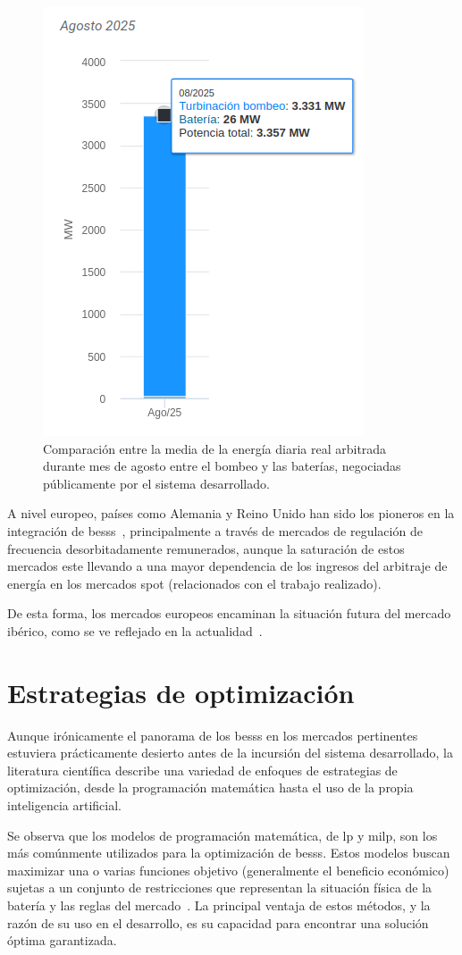 \begin{figure}
  \centering
  \includegraphics[width=0.4\linewidth]{figures/comparacion-energia-ciclada.png}
  \caption[Comparación de la energía diaria arbitrada.]{Comparación entre la media de la energía diaria real arbitrada durante mes de agosto entre el bombeo y las baterías, negociadas públicamente por el sistema desarrollado.}
  \label{fig:comparacion-energia-ciclada}
\end{figure}

A nivel europeo, países como Alemania y Reino Unido han sido los pioneros en la integración de \glspl{bess}~\cite{kivipelto2017grid, tejada2019review}, principalmente a través de mercados de regulación de frecuencia desorbitadamente remunerados, aunque la saturación de estos mercados este llevando a una mayor dependencia de los ingresos del arbitraje de energía en los mercados spot (relacionados con el trabajo realizado).

De esta forma, los mercados europeos encaminan la situación futura del mercado ibérico, como se ve reflejado en la actualidad~\cite{kumar2019strategic}.

\section{Estrategias de optimización}
\label{makereference2.2}

Aunque irónicamente el panorama de los \glspl{bess} en los mercados pertinentes estuviera prácticamente desierto antes de la incursión del sistema desarrollado, la literatura científica describe una variedad de enfoques de estrategias de optimización, desde la programación matemática hasta el uso de la propia inteligencia artificial.

Se observa que los modelos de programación matemática, de \gls{lp} y \gls{milp}, son los más comúnmente utilizados para la optimización de \glspl{bess}. Estos modelos buscan maximizar una o varias funciones objetivo (generalmente el beneficio económico) sujetas a un conjunto de restricciones que representan la situación física de la batería y las reglas del mercado~\cite{mendoza2023review}. La principal ventaja de estos métodos, y la razón de su uso en el desarrollo, es su capacidad para encontrar una solución óptima garantizada.

